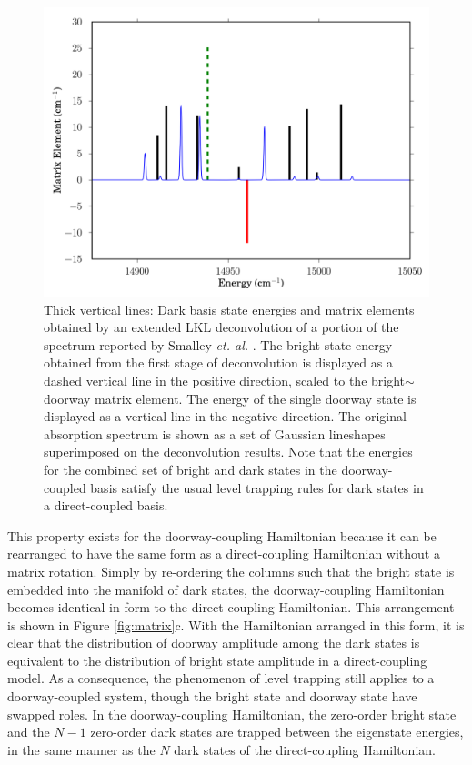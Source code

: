 \begin{figure}
  \caption{Thick vertical lines: Dark basis state energies and matrix
    elements obtained by an extended LKL deconvolution of a portion of
    the  spectrum reported by Smalley \emph{et. al.}
    \cite{smalley75}.  The bright state energy obtained from the first
    stage of deconvolution is displayed as a dashed vertical line in
    the positive direction, scaled to the bright$\sim$doorway matrix
    element.  The energy of the single doorway state is displayed as a
    vertical line in the negative direction.  The original absorption
    spectrum is shown as a set of Gaussian lineshapes superimposed on
    the deconvolution results.  Note that the energies for the
    combined set of bright and dark states in the doorway-coupled
    basis satisfy the usual level trapping rules for dark states in a
    direct-coupled basis.}
  \label{fig:smalley-doorway}
  \centering
  \includegraphics[width=6in]{smalley-doorway.png}
\end{figure}

This property exists for the doorway-coupling Hamiltonian because it
can be rearranged to have the same form as a direct-coupling
Hamiltonian without a matrix rotation.  Simply by re-ordering the
columns such that the bright state is embedded into the manifold of
dark states, the doorway-coupling Hamiltonian becomes identical in
form to the direct-coupling Hamiltonian.  This arrangement is shown in
Figure \ref{fig:matrix}c.  With the Hamiltonian arranged in this form,
it is clear that the distribution of doorway amplitude among the dark
states is equivalent to the distribution of bright state amplitude in
a direct-coupling model.  As a consequence, the phenomenon of level
trapping still applies to a doorway-coupled system, though the bright
state and doorway state have swapped roles.  In the doorway-coupling
Hamiltonian, the zero-order bright state and the $N-1$ zero-order dark
states are trapped between the eigenstate energies, in the same manner
as the $N$ dark states of the direct-coupling Hamiltonian.

